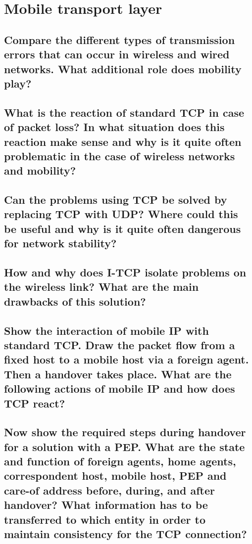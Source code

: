 \section{Mobile transport layer}

\subsection{Compare the different types of transmission errors that can occur in wireless and
wired networks. What additional role does mobility play?}

\subsection{What is the reaction of standard TCP in case of packet loss? In what situation does
this reaction make sense and why is it quite often problematic in the case of wireless
networks and mobility?}

\subsection{Can the problems using TCP be solved by replacing TCP with UDP? Where could
this be useful and why is it quite often dangerous for network stability?}

\subsection{How and why does I-TCP isolate problems on the wireless link? What are the main
drawbacks of this solution?}

\subsection{Show the interaction of mobile IP with standard TCP. Draw the packet flow from a
fixed host to a mobile host via a foreign agent. Then a handover takes place. What
are the following actions of mobile IP and how does TCP react?}

\subsection{Now show the required steps during handover for a solution with a PEP. What are the
state and function of foreign agents, home agents, correspondent host, mobile host,
PEP and care-of address before, during, and after handover? What information has
to be transferred to which entity in order to maintain consistency for the TCP
connection?}

